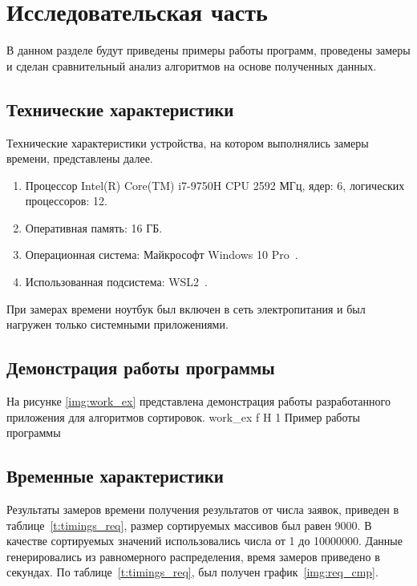 \chapter{Исследовательская часть}

В данном разделе будут приведены примеры работы программ, проведены замеры и сделан сравнительный анализ алгоритмов на основе полученных данных.


\section{Технические характеристики}

Технические характеристики устройства, на котором выполнялись замеры времени, представлены далее.

\begin{enumerate}
	\item Процессор	Intel(R) Core(TM) i7-9750H CPU 2592 МГц, ядер: 6, логических процессоров: 12.
	\item Оперативная память: 16 ГБ.
	\item Операционная система: Майкрософт Windows 10 Pro~\cite{windows}.
	\item Использованная подсистема: WSL2~\cite{WSL2}.
\end{enumerate}

При замерах времени ноутбук был включен в сеть электропитания и был нагружен только системными приложениями.



\section{Демонстрация работы программы}

На рисунке \ref{img:work_ex} представлена демонстрация работы разработанного приложения для алгоритмов сортировок.
{work_ex} %
{f} %
{H} %
{1\textwidth} %
{Пример работы программы} %



\section{Временные характеристики}

Результаты замеров времени получения результатов от числа заявок, приведен в таблице~\ref{t:timings_req}, размер сортируемых массивов был равен 9000.
В качестве сортируемых значений использовались  числа от 1 до 10000000.
Данные генерировались из равномерного распределения, время замеров приведено в секундах.
По таблице~\ref{t:timings_req}, был получен график~\ref{img:req_cmp}.

